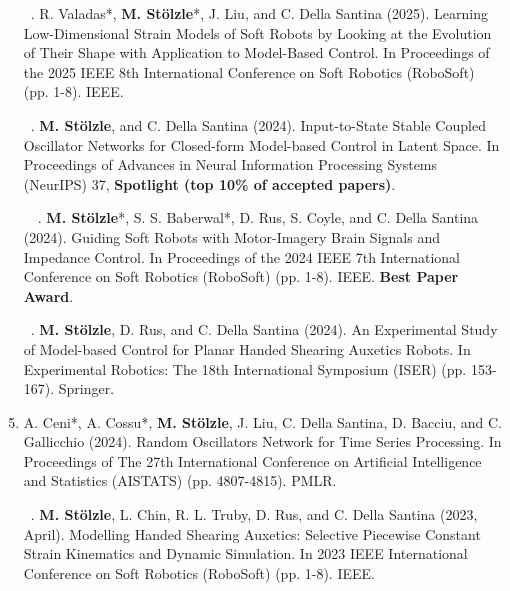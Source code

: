 \begin{enumerate}
    \item[\faFileTextO \, \stepcounter{enumi}\arabic{enumi}.] \citep{valadas2025learning} R. Valadas*, \textbf{M. Stölzle}*, J. Liu, and C. Della Santina (2025). Learning Low-Dimensional Strain Models of Soft Robots by Looking at the Evolution of Their Shape with Application to Model-Based Control. In Proceedings of the 2025 IEEE 8th International Conference on Soft Robotics (RoboSoft) (pp. 1-8). IEEE.
    \item[\faFileTextO \, \stepcounter{enumi}\arabic{enumi}.] \citep{stolzle2024input} \textbf{M. Stölzle}, and C. Della Santina (2024). Input-to-State Stable Coupled Oscillator Networks for Closed-form Model-based Control in Latent Space. In Proceedings of Advances in Neural Information Processing Systems (NeurIPS) 37, \textbf{Spotlight (top 10\% of accepted papers)}.
    \item[\faFileTextO \, \faTrophy \, \stepcounter{enumi}\arabic{enumi}.] \citep{stolzle2024guiding} \textbf{M. Stölzle}*, S. S. Baberwal*, D. Rus, S. Coyle, and C. Della Santina (2024). Guiding Soft Robots with Motor-Imagery Brain Signals and Impedance Control. In Proceedings of the 2024 IEEE 7th International Conference on Soft Robotics (RoboSoft) (pp. 1-8). IEEE. \textbf{Best Paper Award}.
    \item[\faFileTextO \, \stepcounter{enumi}\arabic{enumi}.] \citep{stolzle2024experimental} \textbf{M. Stölzle}, D. Rus, and C. Della Santina (2024). An Experimental Study of Model-based Control for Planar Handed Shearing Auxetics Robots. In Experimental Robotics: The 18th International Symposium (ISER) (pp. 153-167). Springer.
    \item \citep{ceni2024random} A. Ceni*, A. Cossu*, \textbf{M. Stölzle}, J. Liu, C. Della Santina, D. Bacciu, and C. Gallicchio (2024). Random Oscillators Network for Time Series Processing. In Proceedings of The 27th International Conference on Artificial Intelligence and Statistics (AISTATS) (pp. 4807-4815). PMLR.
    \item[\faFileTextO \, \stepcounter{enumi}\arabic{enumi}.] \citep{stolzle2023modelling} \textbf{M. Stölzle}, L. Chin, R. L. Truby, D. Rus, and C. Della Santina (2023, April). Modelling Handed Shearing Auxetics: Selective Piecewise Constant Strain Kinematics and Dynamic Simulation. In 2023 IEEE International Conference on Soft Robotics (RoboSoft) (pp. 1-8). IEEE.

\end{enumerate}
